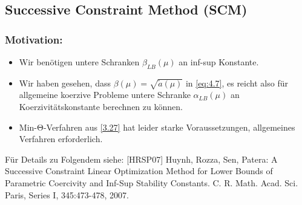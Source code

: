 \subsection*{Successive Constraint Method (SCM)}

\subsubsection*{Motivation:}
\begin{itemize}
	\item Wir benötigen untere Schranken $\beta_{LB}(\mu)$ an inf-sup Konstante.
	\item Wir haben gesehen, dass $\beta(\mu) = \sqrt{\tilde a(\mu)}$ in \eqref{eq:4.7}, es reicht also für allgemeine koerzive Probleme untere Schranke $\alpha_{LB}(\mu)$ an Koerzivitätskonstante berechnen zu können.
	\item Min-$\mathrm\Theta$-Verfahren aus \ref{3.27} hat leider starke Voraussetzungen, allgemeines Verfahren erforderlich.
\end{itemize}

Für Details zu Folgendem siehe: [HRSP07] Huynh, Rozza, Sen, Patera: A Successive Constraint Linear Optimization Method for Lower Bounds of Parametric Coercivity and Inf-Sup Stability Constants. C. R. Math. Acad. Sci. Paris, Series I, 345:473-478, 2007.

